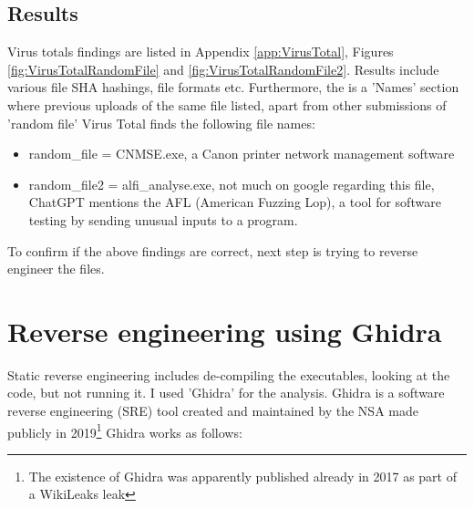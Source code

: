 \documentclass[
	letterpaper, %
	10pt, %
	unnumberedsections, %
	twoside, %
]{APAAssignment}
\begin{document}
\subsection{Results} Virus totals findings are listed in Appendix \ref{app:VirusTotal}, Figures \ref{fig:VirusTotalRandomFile} and \ref{fig:VirusTotalRandomFile2}. Results include various file SHA hashings, file formats etc. Furthermore, the is a 'Names' section where previous uploads of the same file listed, apart from other submissions of 'random file' Virus Total finds the following file names:

\begin{itemize}
	\item random\_file = CNMSE.exe, a Canon printer network management software
	\item random\_file2 = alfi\_analyse.exe, not much on google regarding this file, ChatGPT mentions the AFL (American Fuzzing Lop)\cite{AFLWiki}, a tool for software testing by sending unusual inputs to a program. 
\end{itemize}

To confirm if the above findings are correct, next step is trying to reverse engineer the files.

\section{Reverse engineering using Ghidra}
Static reverse engineering includes de-compiling the executables, looking at the code, but not running it. I used 'Ghidra'\cite{Ghidra} for the analysis. 
Ghidra is a software reverse engineering (SRE) tool created and maintained by the NSA\cite{GhidraGithub} made publicly in 2019\footnote{The existence of Ghidra was apparently published already in 2017 as part of a WikiLeaks leak\cite{Vault7leak}} 
Ghidra works as follows:
\end{document}
